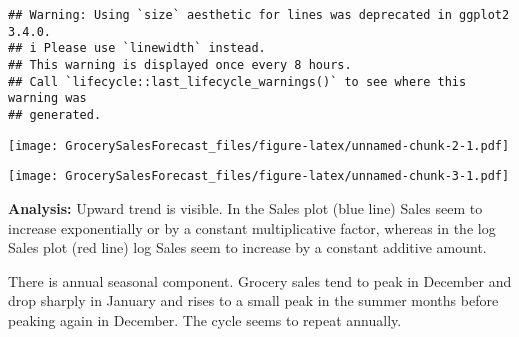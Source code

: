 \documentclass[
]{article}
\newenvironment{Shaded}{\begin{snugshade}}{\end{snugshade}}
\newcommand{\AttributeTok}[1]{\textcolor[rgb]{0.13,0.29,0.53}{#1}}
\newcommand{\ConstantTok}[1]{\textcolor[rgb]{0.56,0.35,0.01}{#1}}
\newcommand{\DecValTok}[1]{\textcolor[rgb]{0.00,0.00,0.81}{#1}}
\newcommand{\FloatTok}[1]{\textcolor[rgb]{0.00,0.00,0.81}{#1}}
\newcommand{\FunctionTok}[1]{\textcolor[rgb]{0.13,0.29,0.53}{\textbf{#1}}}
\newcommand{\NormalTok}[1]{#1}
\newcommand{\SpecialCharTok}[1]{\textcolor[rgb]{0.81,0.36,0.00}{\textbf{#1}}}
\newcommand{\StringTok}[1]{\textcolor[rgb]{0.31,0.60,0.02}{#1}}
\begin{document}
\begin{verbatim}
## Warning: Using `size` aesthetic for lines was deprecated in ggplot2 3.4.0.
## i Please use `linewidth` instead.
## This warning is displayed once every 8 hours.
## Call `lifecycle::last_lifecycle_warnings()` to see where this warning was
## generated.
\end{verbatim}

\texttt{[image: GrocerySalesForecast\_files/figure-latex/unnamed-chunk-2-1.pdf]}

\begin{Shaded}
\end{Shaded}

\texttt{[image: GrocerySalesForecast\_files/figure-latex/unnamed-chunk-3-1.pdf]}

\textbf{Analysis: } Upward trend is visible. In the Sales plot (blue
line) Sales seem to increase exponentially or by a constant
multiplicative factor, whereas in the log Sales plot (red line) log
Sales seem to increase by a constant additive amount.

There is annual seasonal component. Grocery sales tend to peak in
December and drop sharply in January and rises to a small peak in the
summer months before peaking again in December. The cycle seems to
repeat annually.
\end{document}
